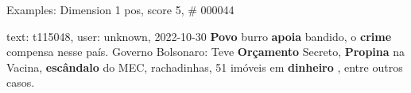 \begin{frame}{Examples: Dimension 1 pos, score 5, \# 000044}
\footnotesize
\begin{exampleblock}{text: t115048, user: unknown, 2022-10-30}
\textbf{Povo} burro \textbf{apoia} bandido, o \textbf{crime} compensa nesse 
país. Governo Bolsonaro: Teve \textbf{Orçamento} Secreto, \textbf{Propina} na 
Vacina, \textbf{escândalo} do MEC, rachadinhas, 51 imóveis em \textbf{dinheiro} 
, entre outros casos. 
\end{exampleblock}
\end{frame}
